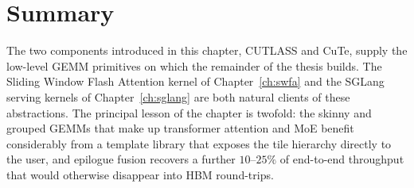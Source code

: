 \section{Summary}\label{sec:cutlass_summary}
The two components introduced in this chapter, CUTLASS and CuTe,
supply the low-level GEMM primitives on which the remainder of
the thesis builds. The Sliding Window Flash Attention kernel of
Chapter~\ref{ch:swfa} and the SGLang serving kernels of
Chapter~\ref{ch:sglang} are both natural clients of these
abstractions. The principal lesson of the chapter is twofold: the
skinny and grouped GEMMs that make up transformer attention and
MoE benefit considerably from a template library that exposes the
tile hierarchy directly to the user, and epilogue fusion recovers
a further $10$--$25\%$ of end-to-end throughput that would
otherwise disappear into HBM round-trips.
